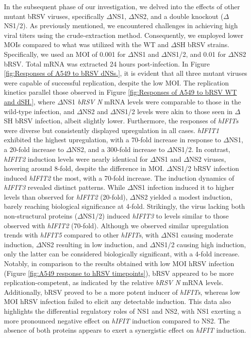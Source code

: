 In the subsequent phase of our investigation, we delved into the effects of other mutant bRSV viruses, specifically \(\Delta\)NS1, \(\Delta\)NS2, and a double knockout (\(\Delta\)NS1/2). As previously mentioned, we encountered challenges in achieving high viral titers using the crude-extraction method. Consequently, we employed lower MOIs compared to what was utilized with the WT and \(\Delta\)SH bRSV strains. Specifically, we used an MOI of 0.001 for \(\Delta\)NS1 and \(\Delta\)NS1/2, and 0.01 for \(\Delta\)NS2 bRSV. Total mRNA was extracted 24 hours post-infection. In Figure \ref{fig:Responses of A549 to bRSV dNSs.}, it is evident that all three mutant viruses were capable of successful replication, despite the low MOI. The replication kinetics parallel those observed in Figure \ref{fig:Responses of A549 to bRSV WT and dSH.}, where \(\Delta\)NS1 \textit{bRSV N} mRNA levels were comparable to those in the wild-type infection, and \(\Delta\)NS2 and \(\Delta\)NS1/2 levels were akin to those seen in \(\Delta\)SH bRSV infection, albeit slightly lower. Furthermore, the responses of \textit{hIFITs} were diverse but consistently displayed upregulation in all cases. \textit{hIFIT1} exhibited the highest upregulation, with a 70-fold increase in response to \(\Delta\)NS1, a 20-fold increase to \(\Delta\)NS2, and a 300-fold increase to \(\Delta\)NS1/2. In contrast, \textit{hIFIT2} induction levels were nearly identical for \(\Delta\)NS1 and \(\Delta\)NS2 viruses, hovering around 8-fold, despite the difference in MOI. \(\Delta\)NS1/2 bRSV infection induced \textit{hIFIT2} the most, with a 70-fold increase. The induction dynamics of \textit{hIFIT3} revealed distinct patterns. While \(\Delta\)NS1 infection induced it to higher levels than observed for \textit{hIFIT2} (20-fold), \(\Delta\)NS2 yielded a modest induction, barely reaching biological significance at 4-fold. Strikingly, the virus lacking both non-structural proteins (\(\Delta\)NS1/2) induced \textit{hIFIT3} to levels similar to those observed with \textit{hIFIT2} (70-fold). Although we observed similar upregulation trends with \textit{hIFIT5} compared to other \textit{hIFITs}, with \(\Delta\)NS1 causing moderate induction, \(\Delta\)NS2 resulting in low induction, and \(\Delta\)NS1/2 causing high induction, only the latter can be considered biologically significant, with a 4-fold increase. Notably, in comparison to the results obtained with low MOI hRSV infection (Figure \ref{fig:A549 response to hRSV timepoints}), bRSV appeared to be more replication-competent, as indicated by the relative \textit{bRSV N} mRNA levels. Additionally, bRSV proved to be a more potent inducer of \textit{hIFITs}, whereas low MOI hRSV infection failed to elicit any detectable induction. This data also highlights the differential regulatory roles of NS1 and NS2, with NS1 exerting a more pronounced negative effect on \textit{hIFIT} induction compared to NS2. The absence of both proteins appears to exert a synergistic effect on \textit{hIFIT} induction.

